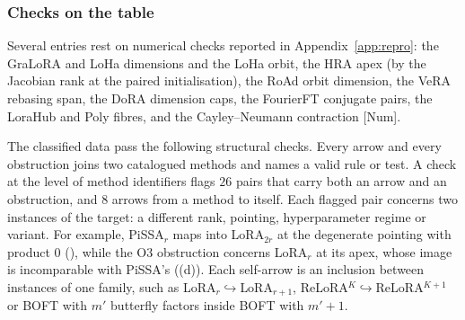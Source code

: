 \subsubsection{Checks on the table}\label{sec:atlas-checks}

Several entries rest on numerical checks reported in Appendix~\ref{app:repro}: the GraLoRA and LoHa dimensions and the
LoHa orbit, the HRA apex (by the Jacobian rank at the paired initialisation), the RoAd orbit dimension, the VeRA rebasing
span, the DoRA dimension caps, the FourierFT conjugate pairs, the LoraHub and Poly fibres, and the Cayley--Neumann
contraction [Num].

The classified data pass the following structural checks. Every arrow and every obstruction joins two catalogued
methods and names a valid rule or test. A check at the level of method identifiers flags $26$ pairs that carry both an
arrow and an obstruction, and $8$ arrows from a method to itself. Each flagged pair concerns two instances of the
target: a different rank, pointing, hyperparameter regime or variant. For example, PiSSA$_r$ maps into LoRA$_{2r}$ at the
degenerate pointing with product $0$ (), while the O3 obstruction concerns LoRA$_r$ at its apex,
whose image is incomparable with PiSSA's ((d)). Each self-arrow is an inclusion between instances
of one family, such as LoRA$_r\hookrightarrow{}$LoRA$_{r+1}$, ReLoRA$^K\hookrightarrow{}$ReLoRA$^{K+1}$ or BOFT with
$m'$ butterfly factors inside BOFT with $m'+1$.

